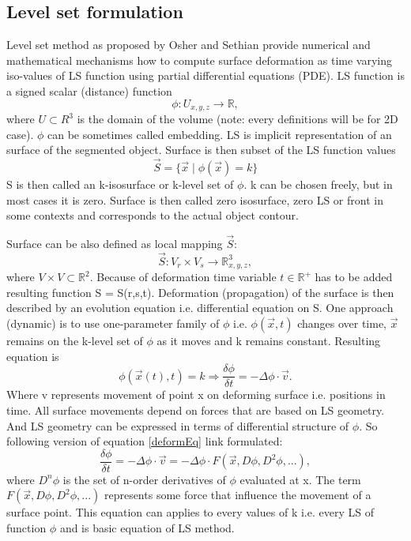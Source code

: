 \subsection{Level set formulation}

Level set method as proposed by Osher and Sethian \cite{sethianLS} provide numerical and mathematical mechanisms how to compute surface deformation as time varying iso-values of LS function using partial differential equations (PDE).
LS function is a signed scalar (distance) function
\begin{equation}
\phi : U_{x,y,z} \rightarrow \mathbb R,
\end{equation}
where $U \subset R^3$ is the domain of the volume (note: every definitions will be for 2D case).
$\phi$ can be sometimes called embedding. LS is implicit representation of an surface of the segmented object.
Surface is then subset of the LS function values
\begin{equation}
\vec{S} = \{\vec{x}\mid \phi(\vec{x}) = k\}
\end{equation}
S is then called an k-isosurface or k-level set of $\phi$. k can be chosen freely, but in most cases it is zero.
Surface is then called zero isosurface, zero LS or front in some contexts and corresponds to the actual object contour.

Surface can be also defined as local mapping $\vec{S}$:
\begin{equation}
\vec{S}: V_r \times V_s \rightarrow \mathbb R^3_{x,y,z},
\end{equation}
where $V \times V \subset \mathbb R^2$. Because of deformation time variable $t\in \mathbb R^+$ has to be added resulting function S = S(r,s,t).
Deformation (propagation) of the surface is then described by an evolution equation i.e. differential equation on S.
One approach (dynamic) is to use one-parameter family of $\phi$ i.e. $\phi(\vec{x},t)$ changes over time, $\vec{x}$ remains on the k-level set of $\phi$ as it moves and k remains constant.
Resulting equation is
\begin{equation}
\label{deformEq}
\phi(\vec{x}(t),t) = k \Rightarrow \frac{\delta \phi}{\delta t} = - \Delta \phi
\cdot \vec{v}.
\end{equation}
Where v represents movement of point x on deforming surface i.e. positions in time.
All surface movements depend on forces that are based on LS geometry.
And LS geometry can be expressed in terms of differential structure of $\phi$.
So following version of equation \ref{deformEq} link formulated:
\begin{equation}
\frac{\delta\phi}{\delta t} = - \Delta \phi \cdot \vec{v} = - \Delta \phi
\cdot F(\vec{x}, D\phi, D^2\phi, ...),
\end{equation}
where $D^n\phi$ is the set of n-order derivatives of $\phi$ evaluated at x.
The term $F(\vec{x}, D\phi, D^2\phi, ...)$ represents some force that influence the movement of a surface point.
This equation can applies to every values of k i.e. every LS of function $\phi$ and is basic equation of LS method.

